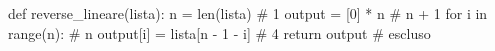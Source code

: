 \begin{unipdcode}[language=Python]
def reverse_lineare(lista):
    n = len(lista)                               # 1
    output = [0] * n                             # n + 1
    for i in range(n):                           # n
        output[i] = lista[n - 1 - i]             # 4
    return output                                # escluso
\end{unipdcode}
